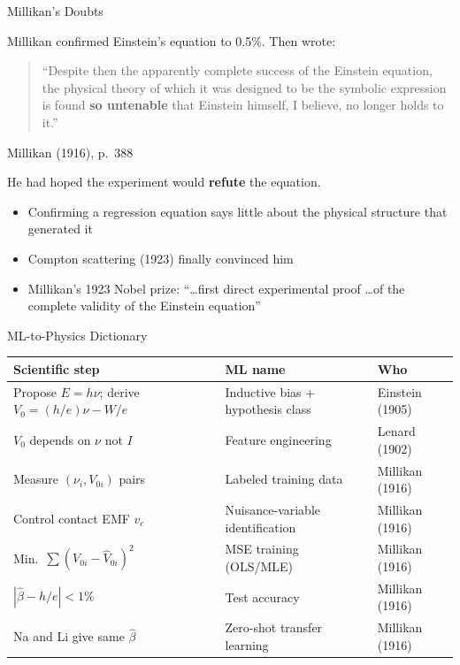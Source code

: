 \documentclass[aspectratio=169]{beamer}
\begin{document}
\begin{frame}{Millikan's Doubts}

Millikan confirmed Einstein's equation to 0.5\%. Then wrote:

\bigskip
\begin{quote}
``Despite then the apparently complete success of the Einstein equation,
the physical theory of which it was designed to be the symbolic expression
is found \textbf{so untenable} that Einstein himself, I believe, no longer
holds to it.''
\end{quote}

\quad \quad \quad Millikan (1916), p.\ 388

\bigskip
He had hoped the experiment would \textbf{refute} the equation.

\bigskip
\begin{itemize}
  \item Confirming a regression equation says little about the physical structure  that generated it
  \item Compton scattering (1923) finally convinced him
  \item Millikan's 1923 Nobel prize: ``\ldots first direct experimental proof
    \ldots of the complete validity of the Einstein equation''
\end{itemize}

\end{frame}

\begin{frame}{ML-to-Physics Dictionary}

\begin{center}
\small
\begin{tabular}{p{5.0cm}p{4.8cm}p{2.6cm}}
\toprule
\textbf{Scientific step} & \textbf{ML name} & \textbf{Who} \\
\midrule
Propose $E = h\nu$; derive $V_0 = (h/e)\nu - W/e$
  & Inductive bias + hypothesis class & Einstein (1905) \\
$V_0$ depends on $\nu$ not $I$
  & Feature engineering & Lenard (1902) \\
Measure $(\nu_i, V_{0i})$ pairs
  & Labeled training data & Millikan (1916) \\
Control contact EMF $v_c$
  & Nuisance-variable identification & Millikan (1916) \\
Min.\ $\sum(V_{0i} - \hat V_{0i})^2$
  & MSE training (OLS/MLE) & Millikan (1916) \\
$|\hat\beta - h/e| < 1\%$
  & Test accuracy & Millikan (1916) \\
Na and Li give same $\hat\beta$
  & Zero-shot transfer learning & Millikan (1916) \\
\bottomrule
\end{tabular}
\end{center}

\end{frame}
\end{document}
